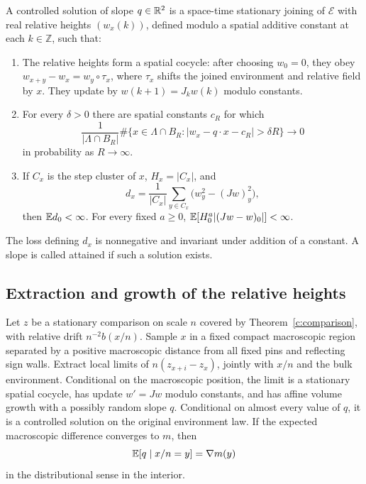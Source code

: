 \begin{definition}\label{b:controlled}
A controlled solution of slope $q\in\mathbb R^2$ is a space-time stationary
joining of $\mathcal E$ with real relative heights $(w_x(k))$, defined
modulo a spatial additive constant at each $k\in\mathbb Z$, such that:
\begin{enumerate}
\item The relative heights form a spatial cocycle: after choosing $w_0=0$,
they obey $w_{x+y}-w_x=w_y\circ\tau_x$, where $\tau_x$ shifts the joined
environment and relative field by $x$. They update by
$w(k+1)=J_k w(k)$ modulo constants.
\item For every $\delta>0$ there are spatial constants $c_R$ for which
\[
 \frac1{|\Lambda\cap B_R|}
 \#\{x\in\Lambda\cap B_R:
       |w_x-q\cdot x-c_R|>\delta R\}
 \longrightarrow0
\]
in probability as $R\to\infty$.
\item If $C_x$ is the step cluster of $x$, $H_x=|C_x|$, and
\[
 d_x=\frac1{|C_x|}\sum_{y\in C_x}
          \bigl(w_y^2-(Jw)_y^2\bigr),
\]
then $\mathbb E d_0<\infty$. For every fixed $a\ge0$,
$\mathbb E[H_0^a|(Jw-w)_0|]<\infty$.
\end{enumerate}
The loss defining $d_x$ is nonnegative and invariant under addition of
a constant. A slope is called attained if such a solution exists.
\end{definition}

\subsection{Extraction and growth of the relative heights}

\begin{lemma}\label{b:extraction}
Let $z$ be a stationary comparison on scale $n$ covered by
Theorem~\ref{c:comparison}, with relative drift $n^{-2}b(x/n)$.
Sample $x$ in a fixed compact macroscopic region separated by a positive
macroscopic distance from all fixed pins and reflecting sign walls.
Extract local limits of
$n(z_{x+i}-z_x)$, jointly with $x/n$ and the bulk environment. Conditional
on the macroscopic position, the limit is a stationary spatial cocycle,
has update $w'=Jw$ modulo constants, and has affine volume growth with a
possibly random slope $q$. Conditional on almost every value of $q$, it is
a controlled solution on the original environment law. If the expected
macroscopic difference converges to $m$, then
\[
 \mathbb E[q\mid x/n=y]=\nabla m(y)
\]
in the distributional sense in the interior.
\end{lemma}

